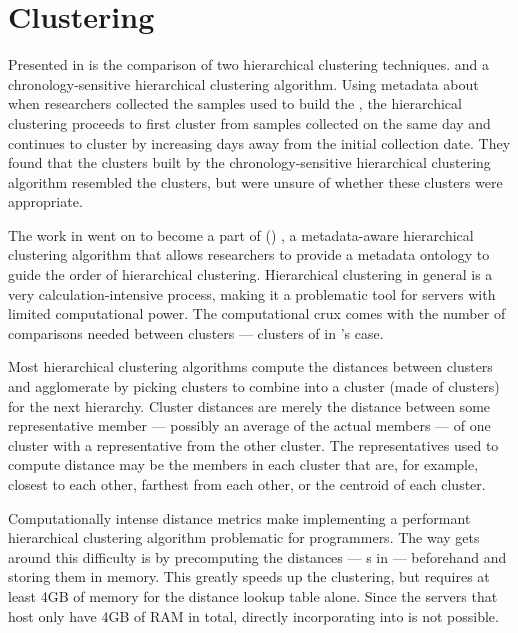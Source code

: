 \section{Clustering}
Presented in \cite{DBLP:conf/bibm/MontanaDNBK11, montana2012investigating} is the comparison of two hierarchical clustering techniques. \primerfive{} \cite{clarke1993non} and a chronology-sensitive hierarchical clustering algorithm.
Using metadata about when researchers collected the samples used to build the \isols{}, the hierarchical clustering proceeds to first cluster \isols{} from samples collected on the same day and continues to cluster by increasing days away from the initial collection date.
They found that the clusters built by the chronology-sensitive hierarchical clustering algorithm resembled the \primerfive{} clusters, but were unsure of whether these clusters were appropriate.

The work in \cite{DBLP:conf/bibm/MontanaDNBK11, montana2012investigating} went on to become a part of \ohclust{} (\ohclustlong{}) \cite{montana2013algorithms, montana2013ontological, SolimanDVMBNWKG12}, a metadata-aware hierarchical clustering algorithm that allows \cplop{} researchers to provide a metadata ontology to guide the order of hierarchical clustering.
Hierarchical clustering in general is a very calculation-intensive process, making it a problematic tool for servers with limited computational power.
The computational crux comes with the number of comparisons needed between clusters --- clusters of \isols{} in \cplop{}'s case.

Most hierarchical clustering algorithms compute the distances between clusters and agglomerate by picking clusters to combine into a cluster (made of clusters) for the next hierarchy.
Cluster distances are merely the distance between some representative member --- possibly an average of the actual members --- of one cluster with a representative from the other cluster.
The representatives used to compute distance may be the members in each cluster that are, for example, closest to each other, farthest from each other, or the centroid of each cluster.

Computationally intense distance metrics make implementing a performant hierarchical clustering algorithm problematic for programmers.
The way \ohclust{} gets around this difficulty is by precomputing the distances --- \pearson{}s in \cplop{} --- beforehand and storing them in memory.
This greatly speeds up the clustering, but requires at least 4GB of memory for the distance lookup table alone.
Since the servers that host \cplop{} only have 4GB of RAM in total, directly incorporating \ohclust{} into \cplop{} is not possible.


